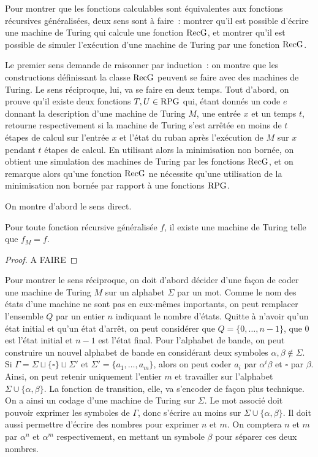 Pour montrer que les fonctions calculables sont équivalentes aux fonctions
récursives généralisées, deux sens sont à faire~: montrer qu'il est possible
d'écrire une machine de Turing qui calcule une fonction $\operatorname{RecG}$, et montrer
qu'il est possible de simuler l'exécution d'une machine de Turing par une
fonction $\operatorname{RecG}$.

Le premier sens demande de raisonner par induction~: on montre que les
constructions définissant la classe $\operatorname{RecG}$ peuvent se faire avec des machines
de Turing. Le sens réciproque, lui, va se faire en deux temps. Tout d'abord, on
prouve qu'il existe deux fonctions $T,U \in \operatorname{RPG}$ qui, étant donnés un code
$e$ donnant la description d'une machine de Turing $M$, une entrée $x$ et un
temps $t$, retourne respectivement si la machine de Turing s'est arrêtée en
moins de $t$ étapes de calcul sur l'entrée $x$ et l'état du ruban après
l'exécution de $M$ sur $x$ pendant $t$ étapes de calcul. En utilisant alors la
minimisation non bornée, on obtient une simulation des machines de Turing par
les fonctions $\operatorname{RecG}$, et on remarque alors qu'une fonction $\operatorname{RecG}$ ne
nécessite qu'une utilisation de la minimisation non bornée par rapport à une
fonctions $\operatorname{RPG}$.

On montre d'abord le sens direct.

\begin{lemma}
  Pour toute fonction récursive généralisée $f$, il existe une machine de
  Turing telle que $f_M = f$.
\end{lemma}

\begin{proof}
  A FAIRE
\end{proof}

Pour montrer le sens réciproque, on doit d'abord décider d'une façon de coder
une machine de Turing $M$ sur un alphabet $\Sigma$ par un mot. Comme le nom des
états d'une machine ne sont pas en eux-mêmes importants, on peut remplacer
l'ensemble $Q$ par un entier $n$ indiquant le nombre d'états. Quitte à n'avoir
qu'un état initial et qu'un état d'arrêt, on peut considérer que
$Q = \{0,\ldots,n-1\}$, que $0$ est l'état initial et $n-1$ est l'état final.
Pour l'alphabet de bande, on peut construire un nouvel alphabet de bande en
considérant deux symboles $\alpha, \beta \notin \Sigma$. Si
$\Gamma = \Sigma \sqcup \{\square\}\sqcup \Sigma'$ et
$\Sigma' = \{a_1,\ldots,a_m\}$, alors on peut coder $a_i$ par $\alpha^i\beta$
et $\square$ par $\beta$. Ainsi, on peut retenir uniquement l'entier $m$ et
travailler sur l'alphabet $\Sigma\cup \{\alpha,\beta\}$. La fonction de
transition, elle, va s'encoder de façon plus technique. On a ainsi un codage
d'une machine de Turing sur $\Sigma$. Le mot associé doit pouvoir exprimer les
symboles de $\Gamma$, donc s'écrire au moins sur $\Sigma\cup\{\alpha,\beta\}$.
Il doit aussi permettre d'écrire des nombres pour exprimer $n$ et $m$. On
comptera $n$ et $m$ par $\alpha^n$ et $\alpha^m$ respectivement, en mettant
un symbole $\beta$ pour séparer ces deux nombres.

